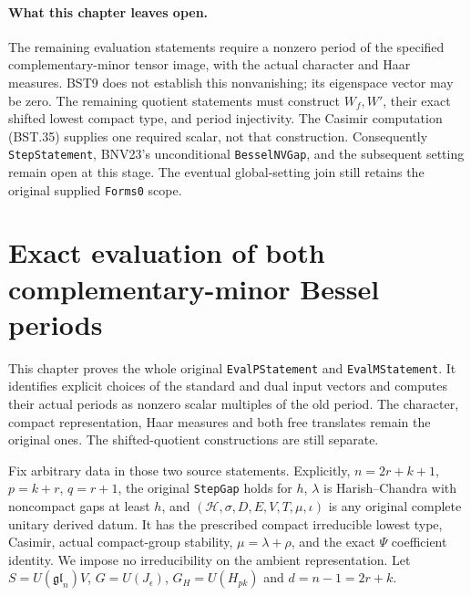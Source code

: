 \documentclass[11pt,a4paper]{article}
\numberwithin{equation}{section}
\theoremstyle{remark}\newtheorem{remark}[theorem]{Remark}
\begin{document}
\paragraph{What this chapter leaves open.}
The remaining evaluation statements require a nonzero period of the
specified complementary-minor tensor image, with the actual
character and Haar measures.  BST9 does not establish this
nonvanishing; its eigenspace vector may be zero.
The remaining quotient statements must construct $W_f,W'$,
their exact shifted lowest compact type, and period injectivity.
The Casimir computation (BST.35) supplies one required scalar, not
that construction.
Consequently \texttt{Step\allowbreak Statement}, BNV23's unconditional
\texttt{Bessel\allowbreak NVGap}, and the subsequent setting remain open at this
stage.  The eventual global-setting join still retains the original
supplied \texttt{Forms0} scope.


\section{Exact evaluation of both complementary-minor Bessel periods}
\label{sec:bessel-period-evaluation-v51}

This chapter proves the whole original \texttt{Eval\allowbreak PStatement} and
\texttt{Eval\allowbreak MStatement}.  It identifies explicit choices of the
standard and dual input vectors and computes their actual periods as
nonzero scalar multiples of the old period.  The character, compact
representation, Haar measures and both free translates remain the
original ones.  The shifted-quotient constructions are still separate.

Fix arbitrary data in those two source statements.  Explicitly,
$n=2r+k+1$, $p=k+r$, $q=r+1$, the original
\texttt{Step\allowbreak Gap} holds for $h$, $\lambda$ is Harish--Chandra with
noncompact gaps at least $h$, and
$(\mathcal H,\sigma,D,E,V,T,\mu,\iota)$ is any original complete
unitary derived datum.  It has the prescribed compact irreducible
lowest type, Casimir, actual compact-group stability,
$\mu=\lambda+\rho$, and the exact $\Psi$ coefficient identity.
We impose no irreducibility on the ambient representation.
Let $S=U(\mathfrak{gl}_n)V$, $G=U(J_\epsilon)$,
$G_H=U(H_{pk})$ and $d=n-1=2r+k$.
\end{document}
